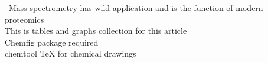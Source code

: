 \ Mass spectrometry has wild application and is the function of modern proteomics 
\\
This is tables and graphs collection for this article \\
Chemfig package required \\
chemtool TeX for chemical drawings \\

